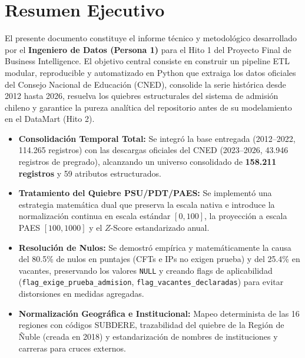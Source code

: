 \documentclass[11pt,a4paper]{article}
\begin{document}
\tableofcontents
\newpage

\section{Resumen Ejecutivo}
El presente documento constituye el informe técnico y metodológico desarrollado por el \textbf{Ingeniero de Datos (Persona 1)} para el Hito 1 del Proyecto Final de Business Intelligence. El objetivo central consiste en construir un pipeline ETL modular, reproducible y automatizado en Python que extraiga los datos oficiales del Consejo Nacional de Educación (CNED), consolide la serie histórica desde 2012 hasta 2026, resuelva los quiebres estructurales del sistema de admisión chileno y garantice la pureza analítica del repositorio antes de su modelamiento en el DataMart (Hito 2).

\begin{tcolorbox}[colback=white, colframe=accentteal, title=\textbf{Cuadro Resumen de Logros Técnicos (Hito 1)}]
\begin{itemize}
    \item \textbf{Consolidación Temporal Total:} Se integró la base entregada (2012--2022, 114.265 registros) con las descargas oficiales del CNED (2023--2026, 43.946 registros de pregrado), alcanzando un universo consolidado de \textbf{158.211 registros} y 59 atributos estructurados.
    \item \textbf{Tratamiento del Quiebre PSU/PDT/PAES:} Se implementó una estrategia matemática dual que preserva la escala nativa e introduce la normalización continua en escala estándar $[0, 100]$, la proyección a escala PAES $[100, 1000]$ y el $Z$-Score estandarizado anual.
    \item \textbf{Resolución de Nulos:} Se demostró empírica y matemáticamente la causa del 80.5\% de nulos en puntajes (CFTs e IPs no exigen prueba) y del 25.4\% en vacantes, preservando los valores \texttt{NULL} y creando flags de aplicabilidad (\texttt{flag\_exige\_prueba\_admision}, \texttt{flag\_vacantes\_declaradas}) para evitar distorsiones en medidas agregadas.
    \item \textbf{Normalización Geográfica e Institucional:} Mapeo determinista de las 16 regiones con códigos SUBDERE, trazabilidad del quiebre de la Región de Ñuble (creada en 2018) y estandarización de nombres de instituciones y carreras para cruces externos.
\end{itemize}
\end{tcolorbox}
\end{document}
